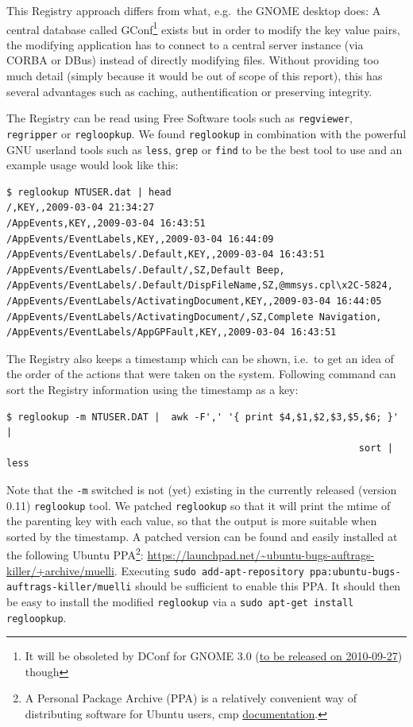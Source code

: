 \documentclass[a4paper,
    11pt,
    normalheadings,
    parindent,
    UKenglish,
    abstracton,
    ]{scrartcl}
\begin{document}
This Registry approach differs from what, e.g.\, the GNOME desktop does: A central database called GConf\footnote{It will be obsoleted by DConf for GNOME 3.0 (\href{http://live.gnome.org/TwoPointThirtyone/}{to be released on 2010-09-27}) though} exists but in order to modify the key value pairs, the modifying application has to connect to a central server instance (via CORBA or DBus) instead of directly modifying files.
Without providing too much detail (simply because it would be out of scope of this report), this has several advantages such as caching, authentification or preserving integrity.

The Registry can be read using Free Software tools such as \texttt{regviewer}, \texttt{regripper} or \texttt{regloopkup}.
We found \texttt{reglookup} in combination with the powerful GNU userland tools such as \texttt{less}, \texttt{grep} or \texttt{find} to be the best tool to use and an example usage would look like this:
\begin{verbatim}
$ reglookup NTUSER.dat | head
/,KEY,,2009-03-04 21:34:27
/AppEvents,KEY,,2009-03-04 16:43:51
/AppEvents/EventLabels,KEY,,2009-03-04 16:44:09
/AppEvents/EventLabels/.Default,KEY,,2009-03-04 16:43:51
/AppEvents/EventLabels/.Default/,SZ,Default Beep,
/AppEvents/EventLabels/.Default/DispFileName,SZ,@mmsys.cpl\x2C-5824,
/AppEvents/EventLabels/ActivatingDocument,KEY,,2009-03-04 16:44:05
/AppEvents/EventLabels/ActivatingDocument/,SZ,Complete Navigation,
/AppEvents/EventLabels/AppGPFault,KEY,,2009-03-04 16:43:51
\end{verbatim}

The Registry also keeps a timestamp which can be shown, i.e.\, to get an idea of the order of the actions that were taken on the system.
Following command can sort the Registry information using the timestamp as a key:
\begin{verbatim}
$ reglookup -m NTUSER.DAT |  awk -F',' '{ print $4,$1,$2,$3,$5,$6; }' |
                                                              sort | less
\end{verbatim}

Note that the \texttt{-m} switched is not (yet) existing in the currently released (version 0.11) \texttt{reglookup} tool.
We patched \texttt{reglookup} so that it will print the mtime of the parenting key with each value, so that the output is more suitable when sorted by the timestamp.
A patched version can be found and easily installed at the following Ubuntu PPA\footnote{A Personal Package Archive (PPA) is a relatively convenient way of distributing software for Ubuntu users, cmp \href{https://help.launchpad.net/Packaging/PPA}{documentation}.}: \url{https://launchpad.net/~ubuntu-bugs-auftrags-killer/+archive/muelli}.
Executing \texttt{sudo add-apt-repository ppa:ubuntu-bugs-auftrags-killer/muelli} should be sufficient to enable this PPA.
It should then be easy to install the modified \texttt{reglookup} via a \texttt{sudo apt-get install regloopkup}.
\end{document}
